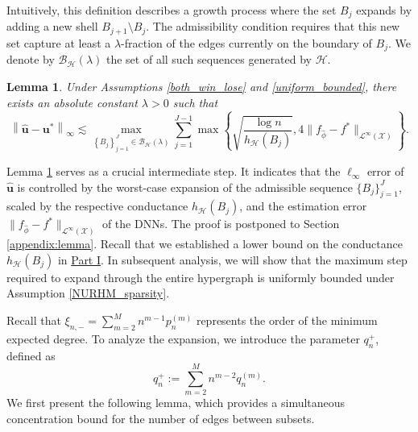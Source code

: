 \documentclass[
  12pt]{article}
\newtheorem{lemma}{Lemma}
\begin{document}
\noindent Intuitively, this definition describes a growth process where the set $B_j$ expands by adding a new shell $B_{j+1} \setminus B_j$. The admissibility condition requires that this new set capture at least a $\lambda$-fraction of the edges currently on the boundary of $B_j$. We denote by $\mathcal{B}_{\mathcal{H}}(\lambda)$ the set of all such sequences generated by $\mathcal{H}$. 

\begin{lemma}
\label{lemma_2}
Under Assumptions \ref{both_win_lose} and \ref{uniform_bounded}, there exists an absolute constant $\lambda>0$ such that
\begin{equation}\label{eq:lemma2}
\left\|\widehat{\boldsymbol{u}}-\boldsymbol{u}^*\right\|_{\infty}  \lesssim \max _{\left\{B_j\right\}_{j=1}^J \in \mathcal{B}_{\mathcal{H}}(\lambda)} \sum_{j=1}^{J-1}  \max\left\{\sqrt{\frac{ \log n}{h_{\mathcal{H}}(B_j)}}, 4\|f_{\widehat{\phi}}-f^*\|_{\mathcal{L}^\infty(\mathcal{X})}\right\}.\end{equation}
\end{lemma}

\noindent Lemma \ref{lemma_2} serves as a crucial intermediate step. It indicates that the $\ell_\infty$ error of $\widehat{\boldsymbol{u}}$ is controlled by the worst-case expansion of the admissible sequence $\{B_j\}_{j=1}^J$, scaled by the respective conductance $h_{\mathcal{H}}(B_j)$, and the estimation error $\|f_{\widehat{\phi}}-f^*\|_{\mathcal{L}^\infty(\mathcal{X})}$ of the DNNs. The proof is postponed to  Section \ref{appendix:lemma}. Recall that  we established a lower bound on the conductance $h_{\mathcal{H}}(B_j)$ in \underline{Part I}. In subsequent analysis,  we will show that the maximum step required to expand through the entire hypergraph is uniformly bounded under Assumption \ref{NURHM_sparsity}. 

Recall that $\xi_{n,-} = \sum_{m=2}^M n^{m-1} p_n^{(m)}$ represents the order of the minimum expected degree. To analyze the expansion, we introduce the parameter $q_{n}^{+}$, defined as 
$$q_{n}^{+} := \sum_{m=2}^M n^{m-2} q_n^{(m)}.$$
\noindent We first present the following lemma, which provides a simultaneous concentration bound for the number of edges between subsets.
\end{document}
